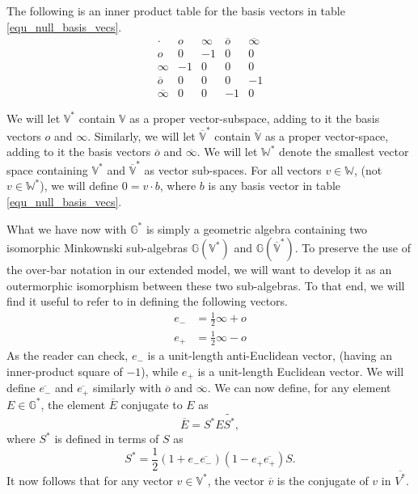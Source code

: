 \documentclass{birkjour}
\theoremstyle{definition}
\theoremstyle{remark}
\numberwithin{equation}{section}
\newcommand{\G}{\mathbb{G}}
\newcommand{\V}{\mathbb{V}}
\newcommand{\W}{\mathbb{W}}
\newcommand{\nvao}{o}
\newcommand{\nvai}{\infty}
\newcommand{\nvaob}{\overline{o}}
\newcommand{\nvaib}{\overline{\infty}}
\newcommand{\eminus}{e_{-}}
\newcommand{\eplus}{e_{+}}
\newcommand{\eminusb}{\overline{e_{-}}}
\newcommand{\eplusb}{\overline{e_{+}}}
\begin{document}
The following is an inner product table for the basis vectors in table \eqref{equ_null_basis_vecs}.
\begin{equation}
\begin{array}{c|cccc}
\cdot & \nvao & \nvai & \nvaob & \nvaib \\
\hline
\nvao & 0 & -1 & 0 & 0 \\
\nvai & -1 & 0 & 0 & 0 \\
\nvaob & 0 & 0 & 0 & -1 \\
\nvaib & 0 & 0 & -1 & 0
\end{array}
\end{equation}

We will let $\V^*$ contain $\V$ as a proper vector-subspace, adding to it the
basis vectors $\nvao$ and $\nvai$.  Similarly, we will let $\overline{\V}^*$ contain
$\overline{\V}$ as a proper vector-space, adding to it the basis vectors $\overline{\nvao}$
and $\overline{\nvai}$.  We will let $\W^*$ denote the smallest vector space containing
$\V^*$ and $\overline{\V}^*$ as vector sub-spaces.
For all vectors $v\in\W$, (not $v\in\W^*$), we will define $0=v\cdot b$, where
$b$ is any basis vector in table \eqref{equ_null_basis_vecs}.

What we have now with $\G^*$ is simply a geometric algebra containing
two isomorphic Minkownski sub-algebras $\G(\V^*)$ and $\G(\overline{\V}^*)$.
To preserve the use of the over-bar notation in our extended model, we will want to develop it
as an outermorphic isomorphism between these two sub-algebras.  To that end, we will
find it useful to refer to \cite{LiRockwood} in defining the following vectors.
\begin{align}
\eminus &= \frac{1}{2}\nvai + \nvao \\
\eplus &= \frac{1}{2}\nvai - \nvao
\end{align}
As the reader can check, $\eminus$ is a unit-length anti-Euclidean vector, (having an inner-product
square of $-1$), while $\eplus$ is a unit-length Euclidean vector.  We will define
$\eminusb$ and $\eplusb$ similarly with $\nvaob$ and $\nvaib$.  We can now
define, for any element $E\in\G^*$, the element $\overline{E}$ conjugate to $E$ as
\begin{equation}
\overline{E} = S^*E\tilde{S^*},
\end{equation}
where $S^*$ is defined in terms of $S$ as
\begin{equation}
S^* = \frac{1}{2}(1+\eminus\eminusb)(1-\eplus\eplusb)S.
\end{equation}
It now follows that for any vector $v\in\V^*$, the vector $\overline{v}$ is the
conjugate of $v$ in $\overline{V^*}$.
\end{document}
